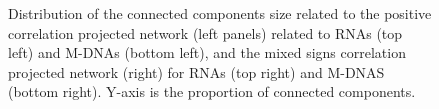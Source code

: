 \documentclass[10pt,a4paper]{article}
\begin{document}
\begin{figure}[h!]
\centering
{}
\caption{\label{fig:ccdistr}Distribution of the connected components size related to the positive correlation projected network (left panels) related to RNAs (top left) and M-DNAs (bottom left), and the mixed signs correlation projected network (right) for RNAs (top right) and M-DNAS (bottom right). Y-axis is the proportion of connected components.}
\end{figure}
\end{document}
